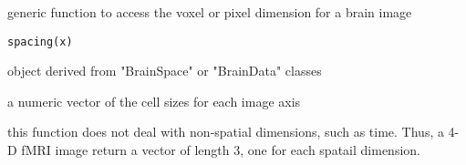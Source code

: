 \begin{Description}\relax
generic function to access the voxel or pixel dimension for a brain image
\end{Description}
\begin{Usage}
\begin{verbatim}
spacing(x)
\end{verbatim}
\end{Usage}
\begin{Arguments}
\begin{ldescription}
\item[\code{x}] object derived from "BrainSpace" or "BrainData" classes 
\end{ldescription}
\end{Arguments}
\begin{Value}
a numeric vector of the cell sizes for each image axis
\end{Value}
\begin{Note}\relax
this function does not deal with non-spatial dimensions, such as
time.  Thus, a 4-D fMRI image return a vector of length 3, one for
each spatail dimension.
\end{Note}

